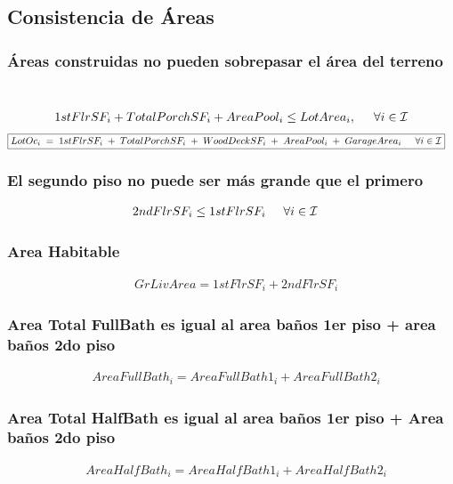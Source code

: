 \documentclass{article}
\begin{document}
\subsection{Consistencia de Áreas}
\subsubsection{Áreas construidas no pueden sobrepasar el área del terreno}\\
\begin{align}
    &1stFlrSF_{i} + TotalPorchSF_{i} + AreaPool_{i} \leq LotArea_{i}, \hspace{5mm}\forall i \in \mathcal{I} \\
\end{align}
\begin{align}
& \boxed{LotOc_i \;=\; 1stFlrSF_i \;+\; TotalPorchSF_i \;+\; WoodDeckSF_i \;+\; AreaPool_i \;+\; GarageArea_i \hspace {5mm} \forall i \in \mathcal{I}}
\end{align}
\subsubsection{El segundo piso no puede ser más grande que el primero}
\begin{align}
    
&2ndFlrSF_{i} \leq 1stFlrSF_{i} \hspace{5mm}\forall i \in \mathcal{I}
\end{align}
\subsubsection{Area Habitable}
\begin{align}
    &GrLivArea = 1stFlrSF_{i} + 2ndFlrSF_{i}
\end{align}
\subsubsection{Area Total FullBath  es igual al area baños 1er piso + area baños 2do piso}
\begin{align}
    &AreaFullBath_{i}=AreaFullBath1_{i}+ AreaFullBath2_{i}
\end{align}
\subsubsection{Area Total HalfBath es igual al area baños 1er piso + Area baños 2do piso}
\begin{align}
    &AreaHalfBath_{i}=AreaHalfBath1_{i}+AreaHalfBath2_{i}
\end{align}
\end{document}
